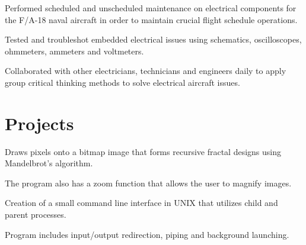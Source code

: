 \documentclass[letterpaper]{deedy-resume} %
\begin{document}
\begin{minipage}[t]{0.66\textwidth}


\vspace{\topsep} %
\begin{tightitemize}
\item Performed scheduled and unscheduled maintenance on electrical components for the F/A-18 naval aircraft in order to maintain crucial flight schedule operations.
\item Tested and troubleshot embedded electrical issues using schematics, oscilloscopes, ohmmeters, ammeters and voltmeters.
\item Collaborated with other electricians, technicians and engineers daily to apply group critical thinking methods to solve electrical aircraft issues.
\end{tightitemize}

\sectionspace %


\section{Projects}


\vspace{\topsep} %
\begin{tightitemize}
\item Draws pixels onto a bitmap image that forms recursive fractal designs using Mandelbrot’s algorithm.
\item The program also has a zoom function that allows the user to magnify images.
\end{tightitemize}

\sectionspace %
\vspace{1.5mm}



\vspace{\topsep} %
\begin{tightitemize}
\item Creation of a small command line interface in UNIX that utilizes child and parent processes.
\item Program includes input/output redirection, piping and background launching.
\end{tightitemize}


\end{minipage}
\end{document}
